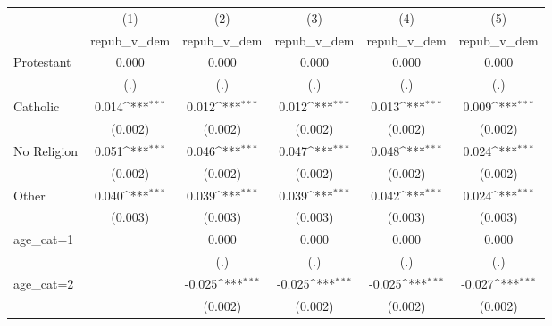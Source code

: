 {
\def\sym#1{\ifmmode^{#1}\else\(^{#1}\)\fi}
\begin{tabular}{l*{5}{c}}
\hline\hline
                    &\multicolumn{1}{c}{(1)}&\multicolumn{1}{c}{(2)}&\multicolumn{1}{c}{(3)}&\multicolumn{1}{c}{(4)}&\multicolumn{1}{c}{(5)}\\
                    &\multicolumn{1}{c}{repub\_v\_dem}&\multicolumn{1}{c}{repub\_v\_dem}&\multicolumn{1}{c}{repub\_v\_dem}&\multicolumn{1}{c}{repub\_v\_dem}&\multicolumn{1}{c}{repub\_v\_dem}\\
\hline
Protestant          &       0.000         &       0.000         &       0.000         &       0.000         &       0.000         \\
                    &         (.)         &         (.)         &         (.)         &         (.)         &         (.)         \\
[1em]
Catholic            &       0.014\sym{***}&       0.012\sym{***}&       0.012\sym{***}&       0.013\sym{***}&       0.009\sym{***}\\
                    &     (0.002)         &     (0.002)         &     (0.002)         &     (0.002)         &     (0.002)         \\
[1em]
No Religion         &       0.051\sym{***}&       0.046\sym{***}&       0.047\sym{***}&       0.048\sym{***}&       0.024\sym{***}\\
                    &     (0.002)         &     (0.002)         &     (0.002)         &     (0.002)         &     (0.002)         \\
[1em]
Other               &       0.040\sym{***}&       0.039\sym{***}&       0.039\sym{***}&       0.042\sym{***}&       0.024\sym{***}\\
                    &     (0.003)         &     (0.003)         &     (0.003)         &     (0.003)         &     (0.003)         \\
[1em]
age\_cat=1           &                     &       0.000         &       0.000         &       0.000         &       0.000         \\
                    &                     &         (.)         &         (.)         &         (.)         &         (.)         \\
[1em]
age\_cat=2           &                     &      -0.025\sym{***}&      -0.025\sym{***}&      -0.025\sym{***}&      -0.027\sym{***}\\
                    &                     &     (0.002)         &     (0.002)         &     (0.002)         &     (0.002)         \\

\end{tabular}}
